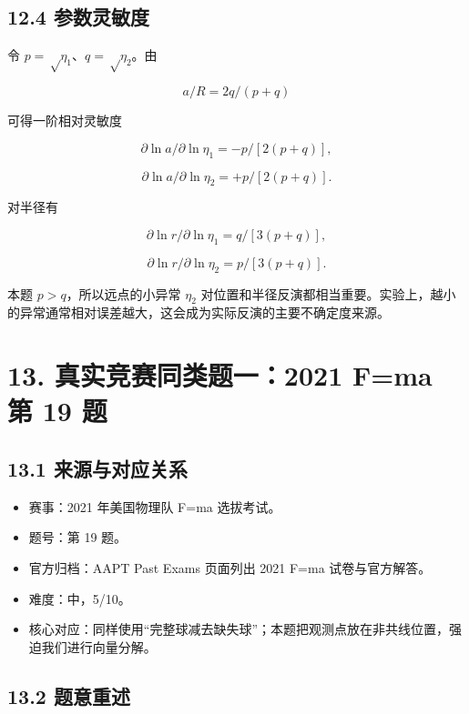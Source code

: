 \documentclass[
  11pt,
  UTF8]{ctexart}
\providecommand{\tightlist}{%
  \setlength{\itemsep}{0pt}\setlength{\parskip}{0pt}}
\begin{document}
\hypertarget{ux53c2ux6570ux7075ux654fux5ea6}{%
\subsection{12.4 参数灵敏度}\label{ux53c2ux6570ux7075ux654fux5ea6}}

令 \(p=√η_1\)、\(q=√η_2\)。由

\[a/R=2q/(p+q)\]

可得一阶相对灵敏度

\[∂\ln a/∂\ln η_1=-p/[2(p+q)],\]

\[∂\ln a/∂\ln η_2=+p/[2(p+q)].\]

对半径有

\[∂\ln r/∂\ln η_1=q/[3(p+q)],\]

\[∂\ln r/∂\ln η_2=p/[3(p+q)].\]

本题 \(p>q\)，所以远点的小异常 \(η_2\)
对位置和半径反演都相当重要。实验上，越小的异常通常相对误差越大，这会成为实际反演的主要不确定度来源。

\hypertarget{ux771fux5b9eux7adeux8d5bux540cux7c7bux9898ux4e002021-fma-ux7b2c-19-ux9898}{%
\section{13. 真实竞赛同类题一：2021 F=ma 第 19
题}\label{ux771fux5b9eux7adeux8d5bux540cux7c7bux9898ux4e002021-fma-ux7b2c-19-ux9898}}

\hypertarget{ux6765ux6e90ux4e0eux5bf9ux5e94ux5173ux7cfb}{%
\subsection{13.1
来源与对应关系}\label{ux6765ux6e90ux4e0eux5bf9ux5e94ux5173ux7cfb}}

\begin{itemize}
\tightlist
\item
  赛事：2021 年美国物理队 F=ma 选拔考试。
\item
  题号：第 19 题。
\item
  官方归档：AAPT Past Exams 页面列出 2021 F=ma 试卷与官方解答。
\item
  难度：中，5/10。
\item
  核心对应：同样使用``完整球减去缺失球''；本题把观测点放在非共线位置，强迫我们进行向量分解。
\end{itemize}

\hypertarget{ux9898ux610fux91cdux8ff0}{%
\subsection{13.2 题意重述}\label{ux9898ux610fux91cdux8ff0}}
\end{document}
